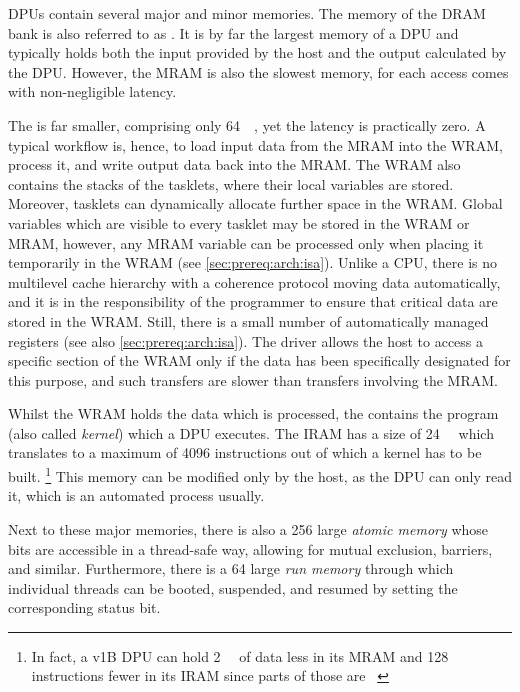 \Acp{DPU} contain several major and minor memories.
The memory of the \ac{DRAM} bank is also referred to as .
It is by far the largest memory of a \ac{DPU} and typically holds both the input provided by the host and the output calculated by the \ac{DPU}.
However, the \ac{MRAM} is also the slowest memory, for each access comes with non-negligible latency.

The  is far smaller, comprising only \qty{64}{\kibi\byte}, yet the latency is practically zero.
A typical workflow is, hence, to load input data from the \ac{MRAM} into the \ac{WRAM}, process it, and write output data back into the \ac{MRAM}.
The \ac{WRAM} also contains the stacks of the tasklets, where their local variables are stored.
Moreover, tasklets can dynamically allocate further space in the \ac{WRAM}.
Global variables which are visible to every tasklet may be stored in the \ac{WRAM} or \ac{MRAM}, however, any \ac{MRAM} variable can be processed only when placing it temporarily in the \ac{WRAM} (see \cref{sec:prereq:arch:isa}).
Unlike a \ac{CPU}, there is no multilevel cache hierarchy with a coherence protocol moving data automatically, and it is in the responsibility of the programmer to ensure that critical data are stored in the \ac{WRAM}.
Still, there is a small number of automatically managed registers (see also \cref{sec:prereq:arch:isa}).
The driver allows the host to access a specific section of the \ac{WRAM} only if the data has been specifically designated for this purpose, and such transfers are slower than transfers involving the \ac{MRAM}.

Whilst the \ac{WRAM} holds the data which is processed, the  contains the program (also called \emph{kernel}) which a \ac{DPU} executes.
The \ac{IRAM} has a size of \qty{24}{\kibi\byte} which translates to a maximum of \num{4096} instructions out of which a kernel has to be built.%
\footnote{
	In fact, a v1B \ac{DPU} can hold \qty{2}{\kibi\byte} of data less in its \ac{MRAM} and 128 instructions fewer in its \ac{IRAM} since parts of those are ~\cite[Introduction~-- DPU chip characteristics]{upmemSDK}
}
This memory can be modified only by the host, as the \ac{DPU} can only read it, which is an automated process usually.

Next to these major memories, there is also a \qty{256}{\bit} large \emph{atomic memory} whose bits are accessible in a thread-safe way, allowing for mutual exclusion, barriers, and similar.
Furthermore, there is a \qty{64}{\bit} large \emph{run memory} through which individual threads can be booted, suspended, and resumed by setting the corresponding status bit.
